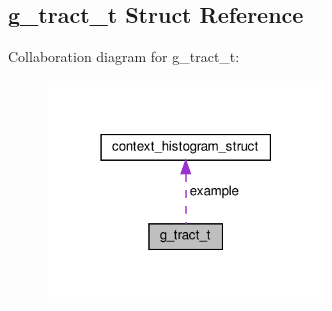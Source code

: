 \hypertarget{structg__tract__t}{}\subsection{g\+\_\+tract\+\_\+t Struct Reference}
\label{structg__tract__t}


Collaboration diagram for g\+\_\+tract\+\_\+t\+:\nopagebreak
\begin{figure}[H]
\begin{center}
\leavevmode
\includegraphics[width=207pt]{structg__tract__t__coll__graph}
\end{center}
\end{figure}
